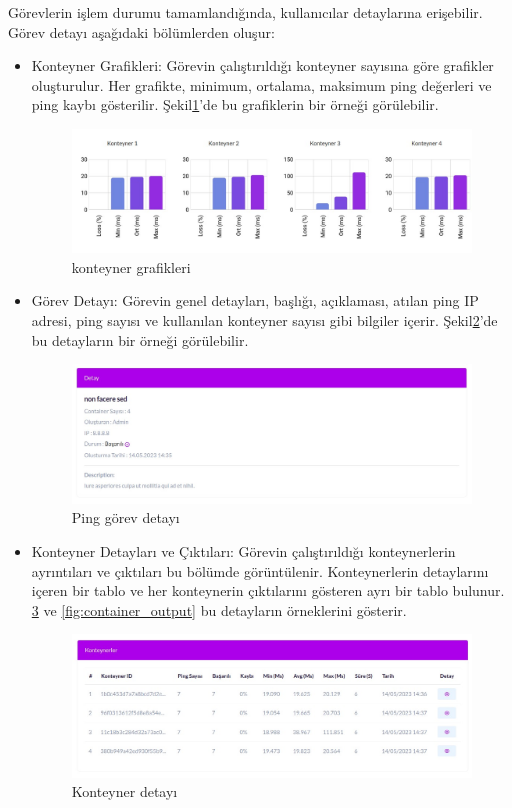 Görevlerin işlem durumu tamamlandığında, kullanıcılar detaylarına erişebilir. Görev detayı aşağıdaki bölümlerden oluşur:
\begin{itemize}
	\item Konteyner Grafikleri: Görevin çalıştırıldığı konteyner sayısına göre grafikler oluşturulur. Her grafikte, minimum, ortalama, maksimum ping değerleri ve ping kaybı gösterilir. Şekil\ref{fig:container_graphic}'de bu grafiklerin bir örneği görülebilir.
	      \begin{figure}[ht]
		      \centering
		      \includegraphics[width=0.7\linewidth]{images/ping_graphic.jpeg}
		      \caption{konteyner grafikleri}
		      \label{fig:container_graphic}
	      \end{figure}

	\item Görev Detayı: Görevin genel detayları, başlığı, açıklaması, atılan ping IP adresi, ping sayısı ve kullanılan konteyner sayısı gibi bilgiler içerir. Şekil\ref{fig:ping_detail}'de bu detayların bir örneği görülebilir.
	      \begin{figure}[ht]
		      \centering
		      \includegraphics[width=0.7\linewidth]{images/ping_detail.jpeg}
		      \caption{Ping görev detayı}
		      \label{fig:ping_detail}
	      \end{figure}

	\item Konteyner Detayları ve Çıktıları: Görevin çalıştırıldığı konteynerlerin ayrıntıları ve çıktıları bu bölümde görüntülenir. Konteynerlerin detaylarını içeren bir tablo ve her konteynerin çıktılarını gösteren ayrı bir tablo bulunur. \ref{fig:container_detail} ve \ref{fig:container_output} bu detayların örneklerini gösterir.
	      \begin{figure}[ht]
		      \centering
		      \includegraphics[width=0.7\linewidth]{images/container_detail.jpeg}
		      \caption{Konteyner detayı}
		      \label{fig:container_detail}
	      \end{figure}


\end{itemize}
